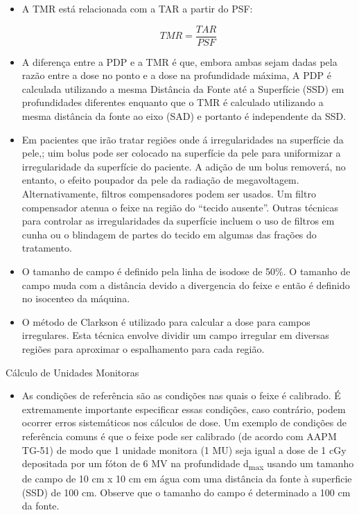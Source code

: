 \documentclass[11pt,a4paper]{article}
\newcounter{exemplo}
\begin{document}
\begin{exemplo}
\begin{itemize}
        \item A TMR está relacionada com a TAR a partir do PSF:
        
            $$TMR = \frac{TAR}{PSF}$$

        \item A diferença entre a PDP e a TMR é que, embora ambas sejam dadas pela razão entre a dose no ponto e a dose na profundidade máxima, A PDP é calculada utilizando a mesma Distância da Fonte até a Superfície (SSD) em profundidades diferentes enquanto que o TMR é calculado utilizando a mesma distância da fonte ao eixo (SAD) e portanto é independente da SSD. 
        
        \item Em pacientes que irão tratar regiões onde á irregularidades na superfície da pele,; uim bolus pode ser colocado na superfície da pele para uniformizar a irregularidade da superfície do paciente. A adição de um bolus removerá, no entanto, o efeito poupador da pele da radiação de megavoltagem. Alternativamente, filtros compensadores podem ser usados. Um filtro compensador atenua o feixe na região do “tecido ausente”. Outras técnicas para controlar as irregularidades da superfície incluem o uso de filtros em cunha ou o blindagem de partes do tecido em algumas das frações do tratamento.
        
        \item O tamanho de campo é definido pela linha de isodose de 50\%. O tamanho de campo muda com a distância devido a divergencia do feixe e então é definido no isocenteo da máquina.
        
        \item O método de Clarkson é utilizado para calcular a dose para campos irregulares. Esta técnica envolve dividir um campo irregular em diversas regiões para aproximar o espalhamento para cada região. 
    \end{itemize}

    \textcolor{CarnationPink}{Cálculo de Unidades Monitoras}
    \begin{itemize}
        \item As condições de referência são as condições nas quais o feixe é calibrado. É extremamente importante especificar essas condições, caso contrário, podem ocorrer erros sistemáticos nos cálculos de dose. Um exemplo de condições de referência comuns é que o feixe pode ser calibrado (de acordo com AAPM TG-51) de modo que 1 unidade monitora (1 MU) seja igual a dose de 1 cGy depositada por um fóton de 6 MV na profundidade d\textsubscript{max} usando um tamanho de campo de 10 cm x 10 cm em água com uma distância da fonte à superficie (SSD) de 100 cm. Observe que o tamanho do campo é determinado a 100 cm da fonte.
        

\end{itemize}
\end{exemplo}
\end{document}
